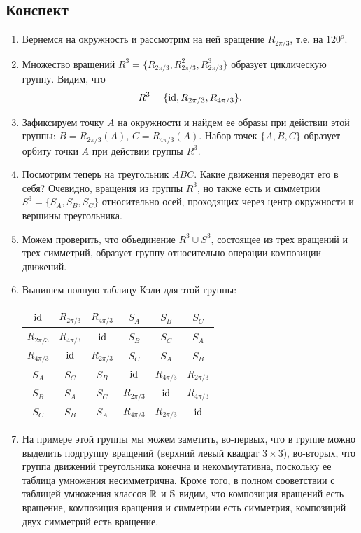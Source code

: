 \subsection{Конспект}
\begin{enumerate}\setlength{\itemsep}{1pt}
\item Вернемся на окружность и рассмотрим на ней вращение $R_{2\pi/3}$, т.е. на $120^o$.
\item Множество вращений $R^3=\{R_{2\pi/3},R_{2\pi/3}^2,R_{2\pi/3}^3\}$ образует циклическую группу. Видим, что
$$
R^3 = \{\id,R_{2\pi/3},R_{4\pi/3}\}.
$$
\item Зафиксируем точку $A$ на окружности и найдем ее образы при действии этой группы: $B=R_{2\pi/3}(A)$, $C=R_{4\pi/3}(A)$. Набор точек $\{A,B,C\}$ образует орбиту точки $A$ при действии группы $R^3$.
\item Посмотрим теперь на треугольник $ABC$. Какие движения переводят его в себя? Очевидно, вращения из группы $R^3$, но также есть и симметрии $S^3=\{S_A, S_B, S_C\}$ относительно осей, проходящих через центр окружности и вершины треугольника.
\item Можем проверить, что объединение $R^3\cup S^3$, состоящее из трех вращений и трех симметрий, образует группу относительно операции композиции движений.
\item Выпишем полную таблицу Кэли для этой группы:
\begin{table}[htb!]\begin{center}
\begin{tabular}{|c|c|c||c|c|c|}
\hline
$\id$        & $R_{2\pi/3}$ & $R_{4\pi/3}$ & $S_A$        & $S_B$        & $S_C$  \\  \hline
$R_{2\pi/3}$ & $R_{4\pi/3}$ & $\id$        & $S_B$        & $S_C$        & $S_A$  \\  \hline
$R_{4\pi/3}$ & $\id$        & $R_{2\pi/3}$ & $S_C$        & $S_A$        & $S_B$  \\  \hline\hline
$S_A$        & $S_C$        & $S_B$        & $\id$        & $R_{4\pi/3}$ & $R_{2\pi/3}$  \\  \hline
$S_B$        & $S_A$        & $S_C$        & $R_{2\pi/3}$ & $\id$        & $R_{4\pi/3}$  \\  \hline
$S_C$        & $S_B$        & $S_A$        & $R_{4\pi/3}$ & $R_{2\pi/3}$ & $\id$   \\  \hline
\end{tabular}
\end{center}\end{table}
\item На примере этой группы мы можем заметить, во-первых, что в группе можно выделить подгруппу вращений (верхний левый квадрат $3\times 3$), во-вторых, что группа движений треугольника конечна и некоммутативна, поскольку ее таблица умножения несимметрична. Кроме того, в полном сооветствии с таблицей умножения классов $\R$ и $\S$ видим, что композиция вращений есть вращение, композиция вращения и симметрии есть симметрия, композиций двух симметрий есть вращение.

\end{enumerate}
